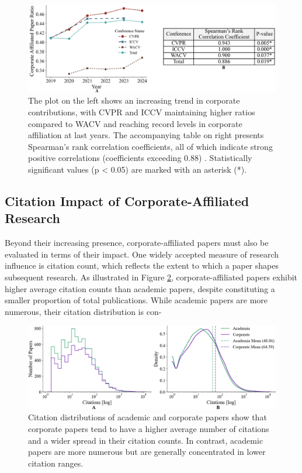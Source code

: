 \documentclass{article}
\begin{document}
\begin{figure}[ht]
    \centering
    \includegraphics[width=0.9\linewidth]{report/images/corporate_ratio_table.png}
    \caption{The plot on the left shows an increasing trend in corporate contributions, with CVPR and ICCV maintaining higher ratios compared to WACV and reaching record levels in corporate affiliation at last years. The accompanying table on right presents Spearman’s rank correlation coefficients, all of which indicate strong positive correlations (coefficients exceeding 0.88) . Statistically significant values (p < 0.05) are marked with an asterisk (*).}
    \label{fig:corporate_ratio_graph}
\end{figure}
\vspace{-18pt}
\subsection{Citation Impact of Corporate-Affiliated Research}
\vspace{-7pt}
Beyond their increasing presence, corporate-affiliated papers must also be evaluated in terms of their impact. One widely accepted measure of research influence is citation count, which reflects the extent to which a paper shapes subsequent research. As illustrated in Figure \ref{fig:ieee_citations}, corporate-affiliated papers exhibit higher average citation counts than academic papers, despite constituting a smaller proportion of total publications. While academic papers are more numerous, their citation distribution is con-
\begin{figure}[ht]
    \centering
    \vspace{-35pt}
    \includegraphics[width=0.9\linewidth]{report/images/ieee_citations.png}
    \caption{Citation distributions of academic and corporate papers show that corporate papers tend to have a higher average number of citations and a wider spread in their citation counts. In contrast, academic papers are more numerous but are generally concentrated in lower citation ranges.}
    \label{fig:ieee_citations}
    \vspace{-17pt}
\end{figure}
\end{document}
